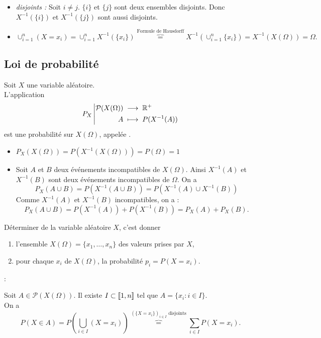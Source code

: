 \documentclass{book}
\begin{document}
\begin{Demonstration}
\begin{itemize}
\item \textit{disjoints :} Soit $i\neq j$. $\{i\}$ et $\{j\}$ sont deux ensembles disjoints. Donc $X^{-1}(\{i\})$ et $X^{-1}(\{j\})$ sont aussi disjoints.   
\item $\cup_{i=1}^n (X=x_i)=\cup_{i=1}^n X^{-1}(\{x_i\})\overbrace{=}^{\text{Formule de Hausdorff}} X^{-1}(\cup_{i=1}^n\{x_i\})=X^{-1}(X(\Omega))=\Omega.$ 
\end{itemize}
\end{Demonstration}

\subsection{Loi de probabilité}
\begin{DefinitionProposition}
Soit $X$ une variable aléatoire.\\
L'application
\[ {P_X}\left|\begin{aligned}{\mathcal{P}(X(\Omega))}&\;\longrightarrow\;{\mathbb{R}^+}\\{A}&\;\longmapsto\;{P(X^{-1}(A))}\end{aligned}\right. \]
est une probabilité sur $X(\Omega)$, appelée .
\end{DefinitionProposition}
\begin{Demonstration}
\begin{itemize}
\item $P_X(X(\Omega))=P(X^{-1}(X(\Omega)))=P(\Omega)=1$
\item Soit $A$ et $B$ deux événements incompatibles de $X(\Omega)$. Ainsi $X^{-1}(A)$ et $X^{-1}(B)$ sont deux événements incompatibles de $\Omega$. On a
 $$P_X(A\cup B)=P(X^{-1}(A\cup B))=P(X^{-1}(A)\cup X^{-1}(B))$$
Comme  $X^{-1}(A)$ et  $X^{-1}(B)$ incompatibles, on a :
 $$P_X(A\cup B)=P(X^{-1}(A))+ P(X^{-1}(B))=P_X(A)+P_X(B).$$
\end{itemize}
\end{Demonstration}
\begin{Proposition}
Déterminer  de la variable aléatoire $X$, c'est donner
\begin{enumerate}
\item l'ensemble $X(\Omega)=\{x_1,\dots,x_n\}$ des valeurs prises par $X$,
\item pour chaque $x_i$ de $X(\Omega)$, la probabilité $p_i=P(X=x_i)$. 
\end{enumerate} : 
\end{Proposition}
\begin{Demonstration}
Soit $A \in \mathcal{P}(X(\Omega))$. Il existe $I\subset\mathopen\lbrack\!\lbrack1,n \mathclose\rbrack\!\rbrack$ tel que $A=\{x_i:i\in I\}$.\\
On a
$$P(X\in A)=P(\bigcup_{i\in I} (X=x_i))\overbrace{=}^{ (\{X= x_i\})_{i\in I}\text{ disjoints}}\sum_{i\in I}P(X=x_i).$$
\end{Demonstration}
\end{document}
